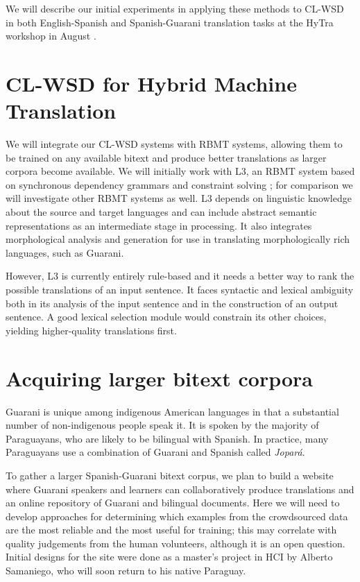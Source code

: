 \documentclass{article}
\begin{document}
We will describe our initial experiments in applying these methods to CL-WSD in
both English-Spanish and Spanish-Guarani translation tasks at the HyTra
workshop in August \cite{rudnick-gasser:2013:HyTra-2013}.

\section{CL-WSD for Hybrid Machine Translation}
We will integrate our CL-WSD systems with RBMT systems, allowing them
to be trained on any available bitext and produce better translations as larger
corpora become available.
We will initially work with L3, an RBMT system based on synchronous dependency
grammars and constraint solving \cite{gasser:sxdg,gasser:aflat2012};
for comparison we will investigate other RBMT systems as well. L3
depends on linguistic knowledge about the source and target languages and can
include abstract semantic representations as an intermediate stage in
processing. It also integrates morphological analysis and generation for
use in translating morphologically rich languages, such as Guarani.

However, L3 is currently entirely rule-based and it needs a better way to rank
the possible translations of an input sentence. It faces syntactic and lexical
ambiguity both in its analysis of the input sentence and in the construction of
an output sentence.  A good lexical selection module would constrain its other
choices, yielding higher-quality translations first.

\section{Acquiring larger bitext corpora}
Guarani is unique among indigenous American languages in that a substantial
number of non-indigenous people speak it. It is spoken by the majority of
Paraguayans, who are likely to be bilingual with Spanish. In practice, many
Paraguayans use a combination of Guarani and Spanish called \emph{Jopar{\'a}}.

To gather a larger Spanish-Guarani bitext corpus, we plan to build a website
where Guarani speakers and learners can collaboratively produce translations
and an online repository of Guarani and bilingual documents.  Here we will need
to develop approaches for determining which examples from the crowdsourced data
are the most reliable and the most useful for training; this may correlate
with quality judgements from the human volunteers, although it is an open
question. Initial designs for the site were done as a master's project in HCI
by Alberto Samaniego, who will soon return to his native Paraguay.
\end{document}
